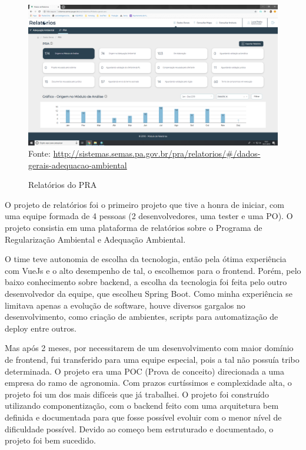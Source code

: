 \begin{figure}[H]
\centering
\caption{Relatórios do PRA} %
\includegraphics[scale=0.22]{relatorios-pra}\\  %
{\small Fonte: \url{http://sistemas.semas.pa.gov.br/pra/relatorios/#/dados-gerais-adequacao-ambiental}} %
\label{fig:exemplo} %
\end{figure}

O projeto de relatórios foi o primeiro projeto que tive a honra de iniciar, com uma equipe formada de 4 pessoas (2 desenvolvedores, uma tester e uma PO).
O projeto consistia em uma plataforma de relatórios sobre o Programa de Regularização Ambiental e Adequação Ambiental.

O time teve autonomia de escolha da tecnologia, então pela ótima experiência com VueJs e o alto desempenho de tal, o escolhemos para o frontend.
Porém, pelo baixo conhecimento sobre backend, a escolha da tecnologia foi feita pelo outro desenvolvedor da equipe, que escolheu Spring Boot.
Como minha experiência se limitava apenas a evolução de software, houve diversos gargalos no desenvolvimento, como criação de ambientes, scripts para automatização de deploy entre outros.

Mas após 2 meses, por necessitarem de um desenvolvimento com maior domínio de frontend, fui transferido para uma equipe especial, pois a tal não possuía tribo determinada.
O projeto era uma POC (Prova de conceito) direcionada a uma empresa do ramo de agronomia. Com prazos curtíssimos e complexidade alta, o projeto foi um dos mais difíceis que já trabalhei.
O projeto foi construído utilizando componentização, com o backend feito com uma arquitetura bem definida e documentada para que fosse possível evoluir com o menor nível de dificuldade possível. Devido ao começo bem estruturado e documentado, o projeto foi bem sucedido.

